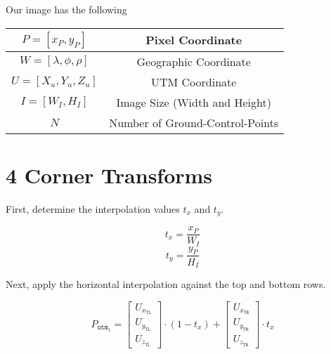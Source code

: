 \documentclass[10pt]{report}
\begin{document}
Our image has the following

\begin{table}\centering

    \begin{tabular}{ | c | c | }
     \hline
     $P = \left[ x_P, y_P \right]$            & Pixel Coordinate                \\\hline
     $W = \left[ \lambda, \phi, \rho \right]$ & Geographic Coordinate           \\\hline
     $U = \left[ X_u, Y_u, Z_u \right]$       & UTM Coordinate                  \\\hline
     $I = \left[ W_I, H_I \right]$            & Image Size (Width and Height)   \\\hline
     $N$                                      & Number of Ground-Control-Points \\\hline
    \end{tabular}
\end{table}

\chapter*{4 Corner Transforms}

First, determine the interpolation values $t_x$ and $t_y$.

\begin{equation}
t_x = \frac{x_P}{W_I}
\end{equation}
\begin{equation}
t_y = \frac{y_P}{H_I}
\end{equation}

Next, apply the horizontal interpolation against the top and bottom rows.

\begin{equation}
P_{\texttt{utm}_1} = 
\begin{bmatrix}
U_{x_\texttt{TL}}\\
U_{y_\texttt{TL}}\\
U_{z_\texttt{TL}}
\end{bmatrix} \cdot \left(1-t_x\right)
+ \begin{bmatrix}
    U_{x_\texttt{TR}}\\
    U_{y_\texttt{TR}}\\
    U_{z_\texttt{TR}}
    \end{bmatrix} \cdot t_x
\end{equation}
\end{document}
